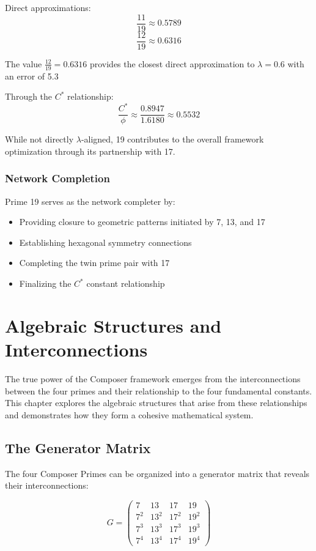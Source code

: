 \documentclass[12pt,a4paper]{report}
\newcommand{\Cstar}{C^*}
\begin{document}
Direct approximations:
\[
\frac{11}{19} \approx 0.5789
\]
\[
\frac{12}{19} \approx 0.6316
\]

The value $\frac{12}{19} = 0.6316$ provides the closest direct approximation to $\lambda = 0.6$ with an error of 5.3%

Through the $\Cstar$ relationship:
\[
\frac{\Cstar}{\phi} \approx \frac{0.8947}{1.6180} \approx 0.5532
\]

While not directly $\lambda$-aligned, 19 contributes to the overall framework optimization through its partnership with 17.

\subsection{Network Completion}

Prime 19 serves as the network completer by:
\begin{itemize}
\item Providing closure to geometric patterns initiated by 7, 13, and 17
\item Establishing hexagonal symmetry connections
\item Completing the twin prime pair with 17
\item Finalizing the $\Cstar$ constant relationship
\end{itemize}

\chapter{Algebraic Structures and Interconnections}

The true power of the Composer framework emerges from the interconnections between the four primes and their relationship to the four fundamental constants. This chapter explores the algebraic structures that arise from these relationships and demonstrates how they form a cohesive mathematical system.

\section{The Generator Matrix}

The four Composer Primes can be organized into a generator matrix that reveals their interconnections:

\[
G = \begin{pmatrix}
7 & 13 & 17 & 19 \\
7^2 & 13^2 & 17^2 & 19^2 \\
7^3 & 13^3 & 17^3 & 19^3 \\
7^4 & 13^4 & 17^4 & 19^4
\end{pmatrix}
\]
\end{document}
